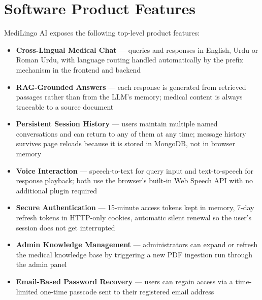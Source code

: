 \section{Software Product Features}

MediLingo AI exposes the following top-level product features:

\begin{itemize}
  \item \textbf{Cross-Lingual Medical Chat} --- queries and responses in English, Urdu or
        Roman Urdu, with language routing handled automatically by the prefix mechanism in
        the frontend and backend

  \item \textbf{RAG-Grounded Answers} --- each response is generated from retrieved passages
        rather than from the LLM's memory; medical content is always traceable to a source
        document

  \item \textbf{Persistent Session History} --- users maintain multiple named conversations
        and can return to any of them at any time; message history survives page reloads
        because it is stored in MongoDB, not in browser memory

  \item \textbf{Voice Interaction} --- speech-to-text for query input and text-to-speech
        for response playback; both use the browser's built-in Web Speech API with no
        additional plugin required

  \item \textbf{Secure Authentication} --- 15-minute access tokens kept in memory,
        7-day refresh tokens in HTTP-only cookies, automatic silent renewal so the user's
        session does not get interrupted

  \item \textbf{Admin Knowledge Management} --- administrators can expand or refresh the
        medical knowledge base by triggering a new PDF ingestion run through the admin panel

  \item \textbf{Email-Based Password Recovery} --- users can regain access via a time-limited
        one-time passcode sent to their registered email address
\end{itemize}

